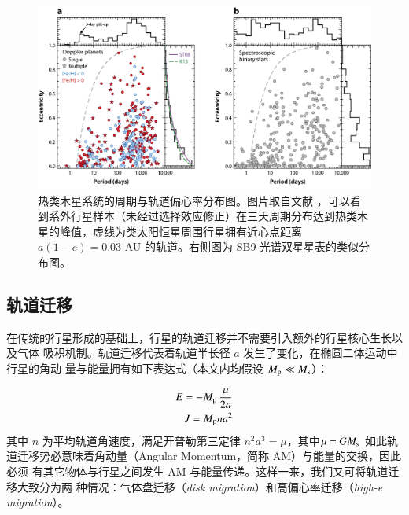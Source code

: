 \begin{figure}[t]
\centering
\includegraphics[width=1.0\textwidth]{figures/chapter4/fig3_peccdist.jpeg}
\caption[热类木星系统的周期与轨道偏心率分布图。可以看到系外行星样本（未经过选择效应修正）在三天周期分布达到热类木星的峰值，虚线为类太阳恒星周围行星拥有近心点距离 $a(1-e) = 0.03$ AU 的轨道。右侧图为 SB9 光谱双星星表的类似分布图，图片取自 Winn 和 Fabrycky。]{热类木星系统的周期与轨道偏心率分布图。图片取自文献 ，可以看到系外行星样本（未经过选择效应修正）在三天周期分布达到热类木星的峰值，虚线为类太阳恒星周围行星拥有近心点距离 $a(1-e) = 0.03$ AU 的轨道。右侧图为 SB9 光谱双星星表的类似分布图。}
\label{fig:hjperecc}
\end{figure}


\subsection{轨道迁移}

在传统的行星形成的基础上，行星的轨道迁移并不需要引入额外的行星核心生长以及气体
吸积机制。轨道迁移代表着轨道半长径 $a$ 发生了变化，在椭圆二体运动中行星的角动
量与能量拥有如下表达式（本文内均假设 $M_\mathrm{p} \ll M_\mathrm{s}$）：

\begin{eqnarray}
E = - M_\mathrm{p} \, \frac{\mu}{2a} \\ \label{eq:2be}
J = M_\mathrm{p} n a^2 \label{eq:2bam}
\end{eqnarray} %
其中 $n$ 为平均轨道角速度，满足开普勒第三定律 $n^2a^3=\mu$，其中$\mu = G M_\mathrm{s}$
如此轨道迁移势必意味着角动量（Angular Momentum，简称 AM）与能量的交换，因此必须
有其它物体与行星之间发生 AM 与能量传递。这样一来，我们又可将轨道迁移大致分为两
种情况：气体盘迁移（\textit{disk migration}）和高偏心率迁移（\textit{high-e migration}）。

